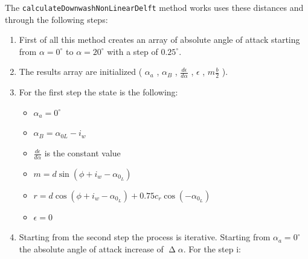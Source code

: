 The \texttt{calculateDownwashNonLinearDelft} method works uses these distances and through the following steps:

\begin{enumerate}

\item First of all this method creates an array of absolute angle of attack starting from $\alpha = 0^{\circ}$ to  $\alpha = 20^{\circ}$ with a step of $0.25^{\circ}$.
\item The results array are initialized ( $\alpha_a$ , $\alpha_B$ , $\frac{d\epsilon}{d\alpha}$ ,  $\epsilon$ , $m  \frac{b}{2}$ ). 
\item For the first step the state is the following:

\begin{itemize}
\item $\alpha_a = 0^{\circ}$ 
\item $\alpha_B =\alpha_{0L} - i_w$ 
\item $\frac{d\epsilon}{d\alpha}$  is the constant value 
\item  $m  = d \sin(\phi + i_w -\alpha_{0_L})$ 
\item  $r  = d \cos(\phi + i_w -\alpha_{0_L}) + 0.75 c_r \cos(-\alpha_{0_L}) $ 
\item $\epsilon = 0$ 
\end{itemize}

\item Starting from the second step the process is iterative. Starting from $\alpha_a = 0^{\circ}$ the absolute angle of attack increase of $\upDelta \alpha$. For the step i:



\end{enumerate}
